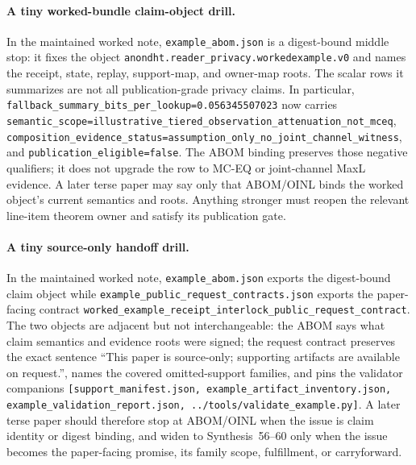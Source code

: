 \documentclass[11pt]{article}
\begin{document}
\paragraph{A tiny worked-bundle claim-object drill.}
In the maintained worked note, \nolinkurl{example_abom.json} is a digest-bound middle stop: it fixes the object \nolinkurl{anondht.reader_privacy.workedexample.v0} and names the receipt, state, replay, support-map, and owner-map roots.  The scalar rows it summarizes are not all publication-grade privacy claims.  In particular, \nolinkurl{fallback_summary_bits_per_lookup=0.056345507023} now carries \nolinkurl{semantic_scope=illustrative_tiered_observation_attenuation_not_mceq}, \nolinkurl{composition_evidence_status=assumption_only_no_joint_channel_witness}, and \nolinkurl{publication_eligible=false}.  The ABOM binding preserves those negative qualifiers; it does not upgrade the row to MC-EQ or joint-channel MaxL evidence.  A later terse paper may say only that ABOM/OINL binds the worked object's current semantics and roots. Anything stronger must reopen the relevant line-item theorem owner and satisfy its publication gate.\cite{series:workedexample,series:releaseproperty}

\paragraph{A tiny source-only handoff drill.}
In the maintained worked note, \nolinkurl{example_abom.json} exports the digest-bound claim object while \nolinkurl{example_public_request_contracts.json} exports the paper-facing contract \nolinkurl{worked_example_receipt_interlock_public_request_contract}. The two objects are adjacent but not interchangeable: the ABOM says what claim semantics and evidence roots were signed; the request contract preserves the exact sentence ``This paper is source-only; supporting artifacts are available on request.'', names the covered omitted-support families, and pins the validator companions \nolinkurl{[support_manifest.json, example_artifact_inventory.json, example_validation_report.json, ../tools/validate_example.py]}. A later terse paper should therefore stop at ABOM/OINL when the issue is claim identity or digest binding, and widen to Synthesis~56--60 only when the issue becomes the paper-facing promise, its family scope, fulfillment, or carryforward.\cite{series:workedexample,series:publicrequestcontracts,series:requestableevidenceclasses,series:requestfulfillmentcertificates,series:publicrequeststatusenvelopes,series:publicrequestcarryforward}
\end{document}
